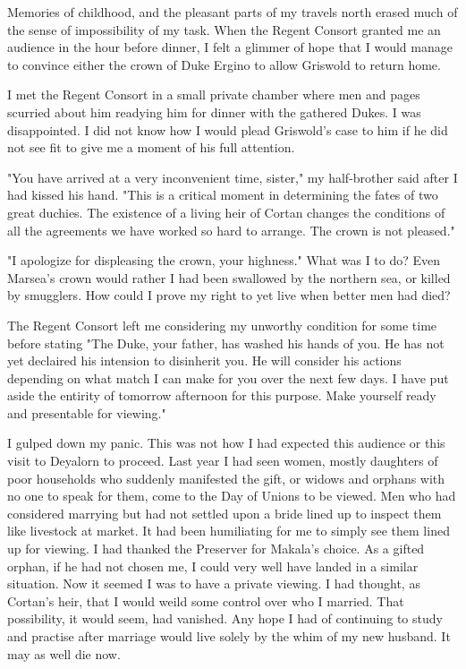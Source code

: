 \documentclass{article}
\begin{document}
Memories of childhood, and the pleasant parts of my travels north erased much of the sense of impossibility of my task. When the Regent Consort granted me an audience in the hour before dinner, I felt a glimmer of hope that I would manage to convince either the crown of Duke Ergino to allow Griswold to return home.

\vspace{.5cm}

I met the Regent Consort in a small private chamber where men and pages scurried about him readying him for dinner with the gathered Dukes. I was disappointed. I did not know how I would plead Griswold's case to him if he did not see fit to give me a moment of his full attention. 

"You have arrived at a very inconvenient time, sister," my half-brother said after I had kissed his hand. "This is a critical moment in determining the fates of two great duchies. The existence of a living heir of Cortan changes the conditions of all the agreements we have worked so hard to arrange. The crown is not pleased."

"I apologize for displeasing the crown, your highness." What was I to do? Even Marsea's crown would rather I had been swallowed by the northern sea, or killed by smugglers. How could I prove my right to yet live when better men had died?

The Regent Consort left me considering my unworthy condition for some time before stating "The Duke, your father, has washed his hands of you. He has not yet declaired his intension to disinherit you. He will consider his actions depending on what match I can make for you over the next few days. I have put aside the entirity of tomorrow afternoon for this purpose. Make yourself ready and presentable for viewing."

I gulped down my panic. This was not how I had expected this audience or this visit to Deyalorn to proceed. Last year I had seen women, mostly daughters of poor households who suddenly manifested the gift, or widows and orphans with no one to speak for them, come to the Day of Unions to be viewed. Men who had considered marrying but had not settled upon a bride lined up to inspect them like livestock at market. It had been humiliating for me to simply see them lined up for viewing. I had thanked the Preserver for Makala's choice. As a gifted orphan, if he had not chosen me, I could very well have landed in a similar situation. Now it seemed I was to have a private viewing. I had thought, as Cortan's heir, that I would weild some control over who I married. That possibility, it would seem, had vanished. Any hope I had of continuing to study and practise after marriage would live solely by the whim of my new husband. It may as well die now.
\end{document}
